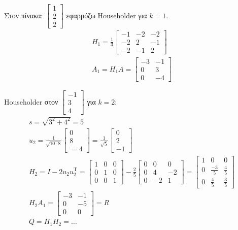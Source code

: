 \documentclass[11pt,a4paper,notitlepage,fleqn]{article}
\begin{document}
Στον πίνακα: \( \left[\begin{matrix}
1\\2\\2
\end{matrix}\right] \) εφαρμόζω Householder για \( k=1 \).
\begin{gather*}
	H_1 = \frac{1}{3} \left[\begin{matrix}
	-1&-2&-2\\-2&2&-1\\-2&-1&2
	\end{matrix}\right] \\
	A_1 = H_1A = \left[\begin{matrix}
	-3&-1\\0&3\\0&-4
	\end{matrix}\right]
\end{gather*}

Householder στον \( \left[\begin{matrix}
-1\\3\\4
\end{matrix}\right] \) για \( k=2 \):
\begin{gather*}
	s=\sqrt{3^2+4^2}=5 \\
	u_2 = \frac{1}{\sqrt{10\cdot 8}}\left[\begin{matrix}
	0\\8\\=4
	\end{matrix}\right] = \frac{1}{\sqrt{5}}\left[\begin{matrix}
	0\\2\\-1
	\end{matrix}\right] \\
	H_2 = I -2u_2u_2^{\mathrm T} = \left[\begin{matrix}
	1&0&0\\0&1&0\\0&0&1
	\end{matrix}\right] - \frac{2}{5}\left[\begin{matrix}
	0&0&0\\0&4&-2\\0&-2&1
	\end{matrix}\right] = \left[\begin{matrix}
	1 & 0 & 0 \\ 0 & \frac{-3}{5} & \frac{4}{5} \\
	0 & \frac{4}{5} & \frac{3}{5}
	\end{matrix}\right] \\
	H_2A_1 = \left[\begin{matrix}
	-3 & -1 \\ 0 & -5 \\ \hline 0 & 0
	\end{matrix}\right] = R \\
	Q = H_1H_2 = \dots
\end{gather*}
\end{document}
